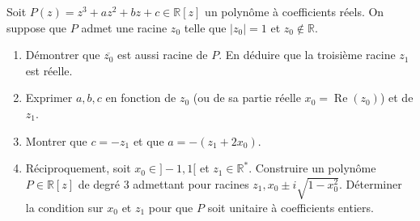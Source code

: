 \documentclass[11pt]{article}
\begin{document}
\begin{exercice}
Soit $P(z) = z^3 + az^2 + bz + c \in \mathbb{R}[z]$ un polynôme à coefficients réels. On suppose que $P$ admet une racine $z_0$ telle que $|z_0| = 1$ et $z_0 \notin \mathbb{R}$.
\begin{enumerate}
    \item Démontrer que $\overline{z_0}$ est aussi racine de $P$. En déduire que la troisième racine $z_1$ est réelle.
    \item Exprimer $a, b, c$ en fonction de $z_0$ (ou de sa partie réelle $x_0 = \operatorname{Re}(z_0)$) et de $z_1$.
    \item Montrer que $c = -z_1$ et que $a = -(z_1 + 2x_0)$.
    \item Réciproquement, soit $x_0 \in ]-1, 1[$ et $z_1 \in \mathbb{R}^*$. Construire un polynôme $P \in \mathbb{R}[z]$ de degré 3 admettant pour racines $z_1, x_0 \pm i\sqrt{1-x_0^2}$. 
    Déterminer la condition sur $x_0$ et $z_1$ pour que $P$ soit unitaire à coefficients entiers.
\end{enumerate}
\end{exercice}
\end{document}
